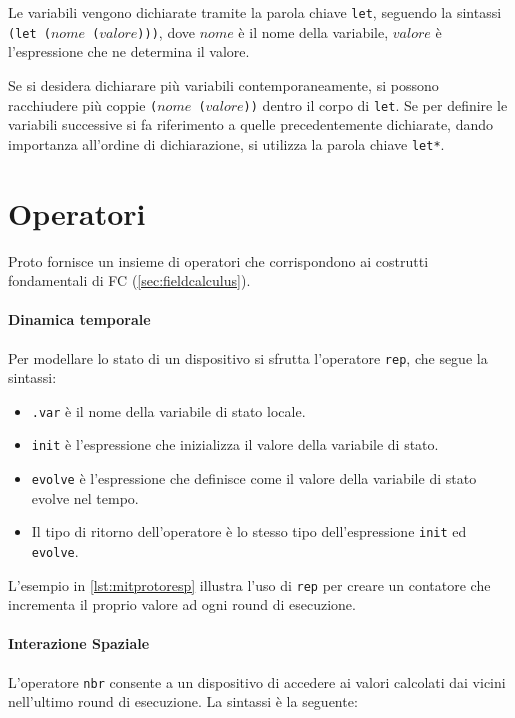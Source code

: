 Le variabili vengono dichiarate tramite la parola chiave \texttt{let}, seguendo la sintassi \texttt{(let (\(nome\) (\(valore\))))}, dove \texttt{\(nome\)} è il nome della variabile, \texttt{\(valore\)} è l'espressione che ne determina il valore.

Se si desidera dichiarare più variabili contemporaneamente, si possono racchiudere più coppie \texttt{(\(nome\) (\(valore\)))} dentro il corpo di \texttt{let}. Se per definire le variabili successive si fa riferimento a quelle precedentemente dichiarate, dando importanza all'ordine di dichiarazione, si utilizza la parola chiave \texttt{let*}.

\section{Operatori}
\label{sec:mitprotooperators}

Proto fornisce un insieme di operatori che corrispondono ai costrutti fondamentali di \ac{FC} (\cref{sec:fieldcalculus}).

\paragraph{Dinamica temporale} Per modellare lo stato di un dispositivo si sfrutta l'operatore \texttt{rep}, che segue la sintassi:



\begin{itemize}
    \item \texttt{.var} è il nome della variabile di stato locale.
    \item \texttt{init} è l'espressione che inizializza il valore della variabile di stato.
    \item \texttt{evolve} è l'espressione che definisce come il valore della variabile di stato evolve nel tempo.
    \item Il tipo di ritorno dell'operatore è lo stesso tipo dell'espressione \texttt{init} ed \texttt{evolve}.
\end{itemize} 
L'esempio in \cref{lst:mitprotoresp} illustra l'uso di \texttt{rep} per creare un contatore che incrementa il proprio valore ad ogni round di esecuzione. 

\paragraph{Interazione Spaziale} L'operatore \texttt{nbr} consente a un dispositivo di accedere ai valori calcolati dai vicini nell'ultimo round di esecuzione. La sintassi è la seguente:

